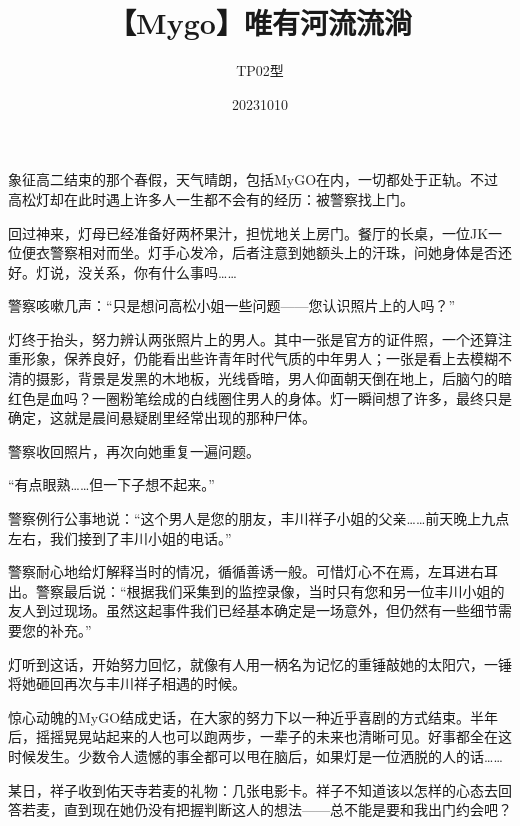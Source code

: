 \documentclass{article}
\title{【Mygo】唯有河流流淌}
\author{TP02型}
\date{20231010}
\begin{document}



\Large

象征高二结束的那个春假，天气晴朗，包括MyGO在内，一切都处于正轨。不过高松灯却在此时遇上许多人一生都不会有的经历：被警察找上门。



回过神来，灯母已经准备好两杯果汁，担忧地关上房门。餐厅的长桌，一位JK一位便衣警察相对而坐。灯手心发冷，后者注意到她额头上的汗珠，问她身体是否还好。灯说，没关系，你有什么事吗……



警察咳嗽几声：“只是想问高松小姐一些问题——您认识照片上的人吗？”



灯终于抬头，努力辨认两张照片上的男人。其中一张是官方的证件照，一个还算注重形象，保养良好，仍能看出些许青年时代气质的中年男人；一张是看上去模糊不清的摄影，背景是发黑的木地板，光线昏暗，男人仰面朝天倒在地上，后脑勺的暗红色是血吗？一圈粉笔绘成的白线圈住男人的身体。灯一瞬间想了许多，最终只是确定，这就是晨间悬疑剧里经常出现的那种尸体。



警察收回照片，再次向她重复一遍问题。



“有点眼熟……但一下子想不起来。”



警察例行公事地说：“这个男人是您的朋友，丰川祥子小姐的父亲……前天晚上九点左右，我们接到了丰川小姐的电话。”



警察耐心地给灯解释当时的情况，循循善诱一般。可惜灯心不在焉，左耳进右耳出。警察最后说：“根据我们采集到的监控录像，当时只有您和另一位丰川小姐的友人到过现场。虽然这起事件我们已经基本确定是一场意外，但仍然有一些细节需要您的补充。”



灯听到这话，开始努力回忆，就像有人用一柄名为记忆的重锤敲她的太阳穴，一锤将她砸回再次与丰川祥子相遇的时候。



惊心动魄的MyGO结成史话，在大家的努力下以一种近乎喜剧的方式结束。半年后，摇摇晃晃站起来的人也可以跑两步，一辈子的未来也清晰可见。好事都全在这时候发生。少数令人遗憾的事全都可以甩在脑后，如果灯是一位洒脱的人的话……



某日，祥子收到佑天寺若麦的礼物：几张电影卡。祥子不知道该以怎样的心态去回答若麦，直到现在她仍没有把握判断这人的想法——总不能是要和我出门约会吧？
\end{document}
